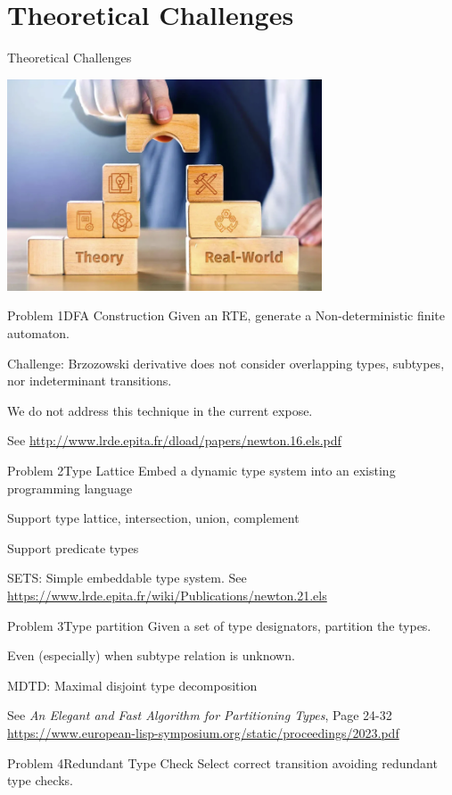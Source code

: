 \section{Theoretical Challenges}


{  
  \begin{frame}{Theoretical Challenges}
      
  \centering
  \includegraphics[width=0.7\textwidth]{theoretic-challenge.png}
\end{frame}
}

\begin{frame}{Problem 1}{DFA Construction}
  Given an RTE, generate a Non-deterministic finite automaton.

  Challenge: Brzozowski derivative does not consider overlapping types, subtypes, nor indeterminant transitions.

  We do not address this technique in the current expose.

  See \url{http://www.lrde.epita.fr/dload/papers/newton.16.els.pdf}

\end{frame}

\begin{frame}{Problem 2}{Type Lattice}
  Embed a dynamic type system into an existing programming language

  Support type lattice, intersection, union, complement

  Support predicate types

  SETS: Simple embeddable type system.
  See \url{https://www.lrde.epita.fr/wiki/Publications/newton.21.els}
\end{frame}

\begin{frame}{Problem 3}{Type partition}
  Given a set of type designators, partition the types.

  Even (especially) when subtype relation is unknown.

  MDTD: Maximal disjoint type decomposition

  See \emph{An Elegant and Fast Algorithm for Partitioning Types}, Page 24-32 \url{https://www.european-lisp-symposium.org/static/proceedings/2023.pdf}

\end{frame}


\begin{frame}{Problem 4}{Redundant Type Check}
  Select correct transition avoiding redundant type checks.

  \scalebox{0.7}{}

\end{frame}

